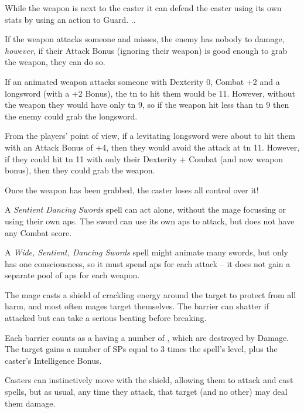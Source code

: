 \begin{multicols}{2}
{While the weapon is next to the caster it can defend the caster using its own stats by using an action to Guard.
}{.}.

If the weapon attacks someone and misses, the enemy has nobody to damage, \emph{however}, if their Attack Bonus (ignoring their weapon) is good enough to grab the weapon, they can do so.

\begin{exampletext}

  If an animated weapon attacks someone with Dexterity 0, Combat +2 and a longsword (with a +2 Bonus), the \gls{tn} to hit them would be 11.
  However, without the weapon they would have only \gls{tn} 9, so if the weapon hit less than \gls{tn} 9 then the enemy could grab the longsword.

  From the players' point of view, if a levitating longsword were about to hit them with an Attack Bonus of +4, then they would avoid the attack at \gls{tn} 11.
  However, if they could hit \gls{tn} 11 with only their Dexterity + Combat (and now weapon bonus), then they could grab the weapon.

\end{exampletext}

Once the weapon has been grabbed, the caster loses all control over it!

A \textit{Sentient Dancing Swords} spell can act alone, without the mage focussing or using their own \glspl{ap}.
The sword can use its own \glspl{ap} to attack, but does not have any Combat score.

A \textit{Wide, Sentient, Dancing Swords} spell might animate many swords, but only has one consciousness, so it must spend \glspl{ap} for each attack -- it does not gain a separate pool of \glspl{ap} for each weapon.


The mage casts a shield of crackling energy around the target to protect from all harm, and most often mages target themselves.
The barrier can shatter if attacked but can take a serious beating before breaking.

Each barrier counts as a having a number of , which are destroyed by Damage.
The target gains a number of \glspl{SP} equal to 3 times the spell's level, plus the caster's Intelligence Bonus.

Casters can instinctively move with the shield, allowing them to attack and cast spells, but as usual, any time they attack, that target (and no other) may deal them damage.


\end{multicols}

